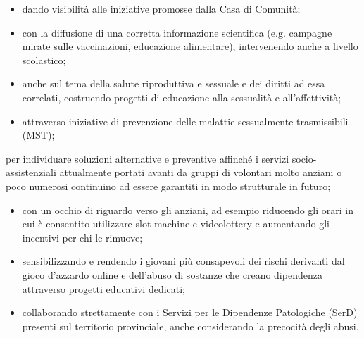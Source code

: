 \begin{itemize}
  \item dando visibilità alle iniziative promosse dalla Casa di Comunità;
  \item con la diffusione di una corretta informazione scientifica (e.g. campagne mirate sulle vaccinazioni, educazione alimentare), intervenendo anche a livello scolastico; 
  \item anche sul tema della salute riproduttiva e sessuale e dei diritti ad essa correlati, costruendo  progetti di educazione alla sessualità e all'affettività;
  \item attraverso iniziative di prevenzione delle malattie sessualmente trasmissibili (MST);
\end{itemize}

 per individuare soluzioni alternative e preventive affinché i servizi socio-assistenziali attualmente portati avanti da gruppi di volontari molto anziani o poco numerosi continuino ad essere garantiti in modo strutturale in futuro;

\begin{bluebox}
\begin{itemize}
  \item con un occhio di riguardo verso gli anziani, ad esempio riducendo gli orari in cui è consentito utilizzare slot machine e videolottery e aumentando gli incentivi per chi le rimuove;
  \item sensibilizzando e rendendo i giovani più consapevoli dei rischi derivanti dal gioco d'azzardo online e dell'abuso di sostanze che creano dipendenza attraverso progetti educativi dedicati;
  \item collaborando strettamente con i Servizi per le Dipendenze Patologiche (SerD) presenti sul territorio provinciale, anche considerando la precocità degli abusi. 
\end{itemize}
\end{bluebox}
